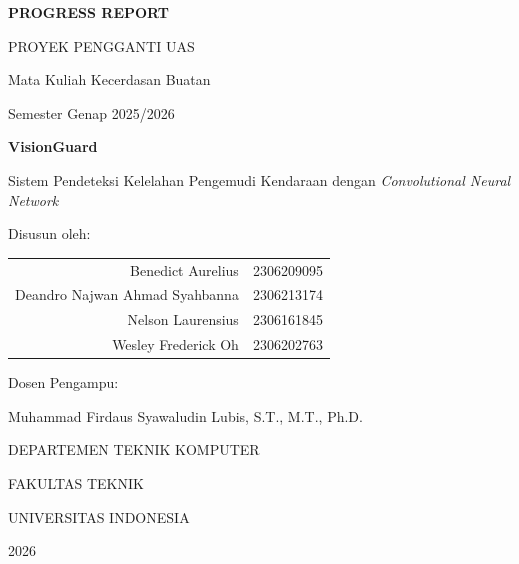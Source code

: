 \documentclass[11pt,a4paper,oneside]{report}
\begin{document}

\begin{titlepage}

\centering

\vspace*{1cm}

{\Large\bfseries PROGRESS REPORT \par}

\vspace{0.3cm}

{\large PROYEK PENGGANTI UAS \par}

\vspace{0.3cm}

{\large Mata Kuliah Kecerdasan Buatan \par}

{\large Semester Genap 2025/2026 \par}

\vspace{2cm}

{\LARGE\bfseries VisionGuard \par}

\vspace{0.5cm}

{\large Sistem Pendeteksi Kelelahan Pengemudi Kendaraan dengan \textit{Convolutional Neural Network} \par}

\vspace{2cm}

{\large Disusun oleh: \par}

\vspace{0.5cm}

\begin{tabular}{rl}
Benedict Aurelius & 2306209095\\
Deandro Najwan Ahmad Syahbanna & 2306213174 \\
Nelson Laurensius & 2306161845 \\
Wesley Frederick Oh & 2306202763 \\
\end{tabular}

\vspace{1.5cm}

{\large Dosen Pengampu: \par}

{\large Muhammad Firdaus Syawaludin Lubis, S.T., M.T., Ph.D. \par}

\vfill

{\large DEPARTEMEN TEKNIK KOMPUTER \par}

{\large FAKULTAS TEKNIK \par}

{\large UNIVERSITAS INDONESIA \par}

{\large 2026 \par}

\end{titlepage}
\end{document}
